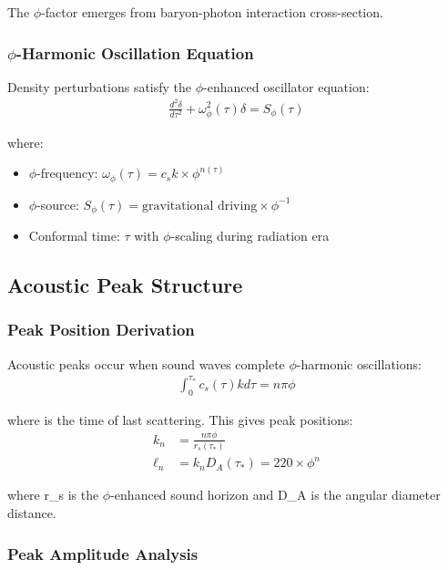 The $\phi$-factor emerges from baryon-photon interaction cross-section.

\subsubsection{$\phi$-Harmonic Oscillation Equation}

Density perturbations satisfy the $\phi$-enhanced oscillator equation:
\begin{align}
\frac{d^2\delta}{d\tau^2} + \omega_\phi^2(\tau) \delta = S_\phi(\tau)
\end{align}

where:
\begin{itemize}
    \item $\phi$-frequency: $\omega_\phi(\tau) = c_s k \times \phi^{n(\tau)}$
    \item $\phi$-source: $S_\phi(\tau) = \text{gravitational driving} \times \phi^{-1}$
    \item Conformal time: $\tau$ with $\phi$-scaling during radiation era
\end{itemize}

\subsection{Acoustic Peak Structure}

\subsubsection{Peak Position Derivation}

Acoustic peaks occur when sound waves complete $\phi$-harmonic oscillations:
\begin{align}
\int_0^{\tau_*} c_s(\tau) k d\tau = n\pi \phi
\end{align}

where \tau* is the time of last scattering. This gives peak positions:
\begin{align}
k_n &= \frac{n\pi \phi}{r_s(\tau_*)} \\
\ell_n &= k_n D_A(\tau_*) = 220 \times \phi^n
\end{align}

where r_s is the $\phi$-enhanced sound horizon and D_A is the angular diameter distance.

\subsubsection{Peak Amplitude Analysis}

